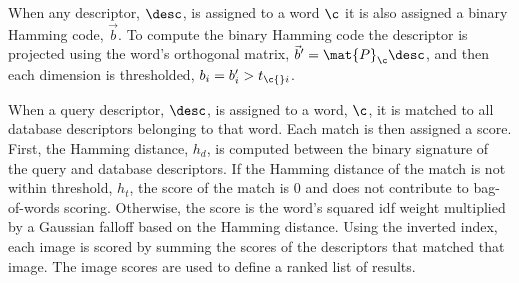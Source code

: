         When any descriptor, $\desc$, is assigned to a word $\c$ it is also assigned a binary Hamming code, $\vec{b}$.
        To compute the binary Hamming code the descriptor is projected using the word's orthogonal matrix, $\vec{b}' =
        \mat{P}_\c \desc$, and then each dimension is thresholded, $b_i = b'_i > t_{\c{}i}$.

        When a query descriptor, $\desc$, is assigned to a word, $\c$, it is matched to all database descriptors
        belonging to that word. Each match is then assigned a score. First, the Hamming distance, $h_d$, is computed
        between the binary signature of the query and database descriptors. If the Hamming distance of the match is not
        within threshold, $h_t$, the score of the match is $0$ and does not contribute to bag-of-words scoring.
        Otherwise, the score is the word's squared idf weight multiplied by a Gaussian falloff based on the Hamming
        distance.
        Using the inverted index, each image is scored by summing the scores of the descriptors that matched that image.
        The image scores are used to define a ranked list of results.



